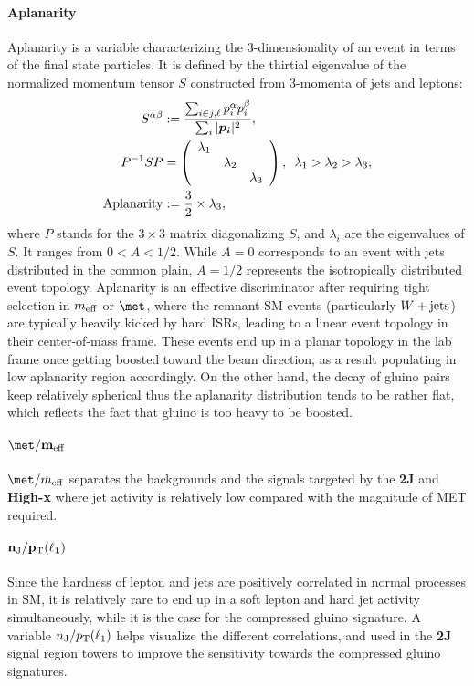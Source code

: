 \paragraph{Aplanarity}
Aplanarity \cite{Aplanarity} is a variable characterizing the 3-dimensionality of an event in terms of the final state particles. 
It is defined by the thirtial eigenvalue of the normalized momentum tensor $S$ constructed from 3-momenta of jets and leptons:
\begin{align}
  S^{\alpha \beta} & := \frac{\sum_{i \in j,\ell} p_i^{\alpha} p_i^{\beta} }{\sum_i |\bm{p_i}|^2 }, \nonumber \\ 
  P^{-1}SP & = \left(
  \begin{array}{c c c }
    \lambda_1  & & \\
    & \lambda_2 & \\
    & & \lambda_3 \\
  \end{array}
  \right), \,\,\, \lambda_1 > \lambda_2 > \lambda_3, \nonumber \\
  \mathrm{Aplanarity} & := \frac {3}{2} \times \lambda_3,
\end{align}
where $P$ stands for the $3\times3$ matrix diagonalizing $S$, and $\lambda_i$ are the eigenvalues of $S$.
It ranges from $0<A<1/2$. While $A=0$ corresponds to an event with jets distributed in the common plain, $A=1/2$ represents the isotropically distributed event topology.
Aplanarity is an effective discriminator after requiring tight selection in $m_{\mathrm{eff}}$ or $\met$, where the remnant SM events (particularly $W+\mathrm{jets}$) are typically heavily kicked by hard ISRs, leading to a linear event topology in their center-of-mass frame. These events end up in a planar topology in the lab frame once getting boosted toward the beam direction, as a result populating in low aplanarity region accordingly. 
On the other hand, the decay of gluino pairs keep relatively spherical thus the aplanarity distribution tends to be rather flat, which reflects the fact that gluino is too heavy to be boosted.




\paragraph{${\bf \met/\meffInc}$}
$\met/\meffInc$ separates the backgrounds and the signals targeted by the \textbf{2J} and \textbf{High-x} where jet activity is relatively low compared with the magnitude of MET required.


\paragraph{${\bf n_{\mathrm{J}}/p_{\mathrm{T}}(\ell_1)}$}
Since the hardness of lepton and jets are positively correlated in normal processes in SM, it is relatively rare to end up in a soft lepton and hard jet activity simultaneously, while it is the case for the compressed gluino signature. A variable $n_{\mathrm{J}}/p_{\mathrm{T}}(\ell_1)$ helps visualize the different correlations, and used in the \textbf{2J} signal region towers to improve the sensitivity towards the compressed gluino signatures.


